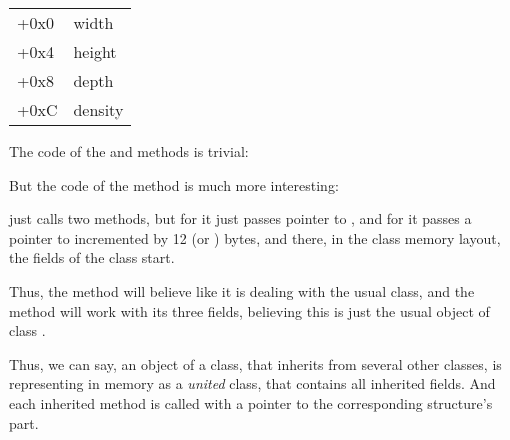 \begin{center}
\begin{tabular}{ | l | l | }
\hline
  \tableheader{} \\
\hline
  +0x0 & width \\
\hline
  +0x4 & height \\
\hline
  +0x8 & depth \\
\hline
  +0xC & density \\
\hline
\end{tabular}
\end{center}


The code of the  and  methods is trivial:






But the code of the  method is much more interesting:




 just calls two methods, but for  it just passes pointer to ,
and for  it passes a pointer to  incremented by 12 (or ) bytes, and there,
in the 
class memory layout, the fields of the  class start.


Thus, the  method will believe like it is dealing with the usual  class,
and the  method will work with its three fields, believing this is just the usual object of class .


Thus, we can say, an object of a class,
that inherits from several other classes, is representing in memory as a \emph{united} class, that contains all inherited fields.
And each inherited method is called with a pointer to 
the corresponding structure's part.

